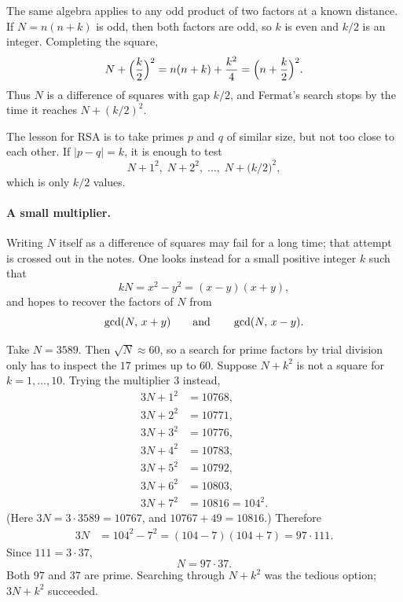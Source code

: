 The same algebra applies to any odd product of two factors at a known distance. If $N=n(n+k)$ is odd, then both factors are odd, so $k$ is even and $k/2$ is an integer. Completing the square,
\[
    N+\Bigl(\frac{k}{2}\Bigr)^2
    = n(n+k)+\frac{k^2}{4}
    = \Bigl(n+\frac{k}{2}\Bigr)^2.
\]
Thus $N$ is a difference of squares with gap $k/2$, and Fermat's search stops by the time it reaches $N+(k/2)^2$.

The lesson for RSA is to take primes $p$ and $q$ of similar size, but not too close to each other. If $|p-q|=k$, it is enough to test
\[
    N+1^2,\; N+2^2,\; \ldots,\; N+\bigl(k/2\bigr)^2,
\]
which is only $k/2$ values.


\paragraph{A small multiplier.}
Writing $N$ itself as a difference of squares may fail for a long time; that attempt is crossed out in the notes. One looks instead for a small positive integer $k$ such that
\[
    kN=x^2-y^2=(x-y)(x+y),
\]
and hopes to recover the factors of $N$ from
\[
    \operatorname{gcd}(N,\, x+y) \qquad\text{and}\qquad \operatorname{gcd}(N,\, x-y).
\]

\begin{example}
Take $N=3589$. Then $\sqrt{N}\approx 60$, so a search for prime factors by trial division only has to inspect the $17$ primes up to $60$.
Suppose $N+k^2$ is not a square for $k=1,\ldots,10$. Trying the multiplier $3$ instead,
\begin{align*}
    3N+1^2 &= 10768,\\
    3N+2^2 &= 10771,\\
    3N+3^2 &= 10776,\\
    3N+4^2 &= 10783,\\
    3N+5^2 &= 10792,\\
    3N+6^2 &= 10803,\\
    3N+7^2 &= 10816 = 104^2.
\end{align*}
(Here $3N=3\cdot 3589=10767$, and $10767+49=10816$.) Therefore
\begin{align*}
    3N &= 104^2-7^2=(104-7)(104+7)=97\cdot 111.
\end{align*}
Since $111=3\cdot 37$,
\[
    N=97\cdot 37.
\]
Both $97$ and $37$ are prime. Searching through $N+k^2$ was the tedious option; $3N+k^2$ succeeded.
\end{example}


